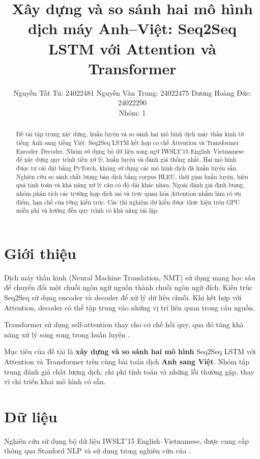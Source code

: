 \documentclass[11pt,a4paper]{article}
\title{
Xây dựng và so sánh hai mô hình dịch máy Anh--Việt:
Seq2Seq LSTM với Attention và Transformer
}
\author{
Nguyễn Tất Tú: 24022481 \quad
Nguyễn Văn Trung: 24022475 \quad
Dương Hoàng Đức: 24022290 \quad \\
Nhóm: 1
}
\begin{document}
\maketitle

\begin{abstract}
Đề tài tập trung xây dựng, huấn luyện và so sánh
hai mô hình dịch máy thần kinh từ tiếng Anh
sang tiếng Việt: Seq2Seq LSTM kết hợp cơ chế
Attention và Transformer Encoder--Decoder.
Nhóm sử dụng bộ dữ liệu song ngữ IWSLT'15
English--Vietnamese để xây dựng quy trình
tiền xử lý, huấn luyện và đánh giá thống nhất.
Hai mô hình được tự cài đặt bằng PyTorch,
không sử dụng các mô hình dịch đã huấn luyện
sẵn. Nghiên cứu so sánh chất lượng bản dịch
bằng corpus BLEU, thời gian huấn luyện,
hiệu quả tính toán và khả năng xử lý câu
có độ dài khác nhau. Ngoài đánh giá định
lượng, nhóm phân tích các trường hợp dịch
sai và trực quan hóa Attention nhằm làm rõ
ưu điểm, hạn chế của từng kiến trúc.
Các thí nghiệm dự kiến được thực hiện
trên GPU miễn phí và hướng đến quy trình có
khả năng tái lập.
\end{abstract}

\section{Giới thiệu}

Dịch máy thần kinh (Neural Machine Translation,
NMT) sử dụng mạng học sâu để chuyển đổi
một chuỗi ngôn ngữ nguồn thành chuỗi
ngôn ngữ đích. Kiến trúc Seq2Seq sử dụng
encoder và decoder để xử lý dữ liệu chuỗi.
Khi kết hợp với Attention, decoder có thể
tập trung vào những vị trí liên quan trong
câu nguồn\citep{bahdanau2015nmt}.

Transformer sử dụng self-attention thay
cho cơ chế hồi quy, qua đó tăng khả năng
xử lý song song trong huấn luyện
\citep{vaswani2017attention}.

Mục tiêu của đề tài là \textbf{xây dựng
và so sánh hai mô hình} Seq2Seq LSTM
với Attention và Transformer trên cùng
bài toán dịch \textbf{Anh sang Việt}.
Nhóm tập trung đánh giá chất lượng dịch,
chi phí tính toán và những lỗi thường gặp,
thay vì chỉ triển khai mô hình có sẵn.

\section{Dữ liệu}

Nghiên cứu sử dụng bộ dữ liệu
IWSLT'15 English--Vietnamese, được cung cấp
thông qua Stanford NLP và sử dụng trong
nghiên cứu của \citet{luong2015iwslt}.
\end{document}
